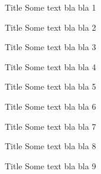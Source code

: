 \documentclass[t,9pt]{beamer}
\begin{document}
\begin{frame}{Title}  %
Some text bla bla 1
\end{frame}

\begin{frame}{Title}  %
Some text bla bla 2
\end{frame}

\begin{frame}{Title}  %
Some text bla bla 3
\end{frame}

\begin{frame}{Title}  %
Some text bla bla 4
\end{frame}

\begin{frame}{Title}  %
Some text bla bla 5
\end{frame}

\begin{frame}{Title}  %
Some text bla bla 6
\end{frame}

\begin{frame}{Title}  %
Some text bla bla 7
\end{frame}

\begin{frame}{Title}  %
Some text bla bla 8
\end{frame}

\begin{frame}{Title}  %
Some text bla bla 9
\end{frame}
\end{document}
